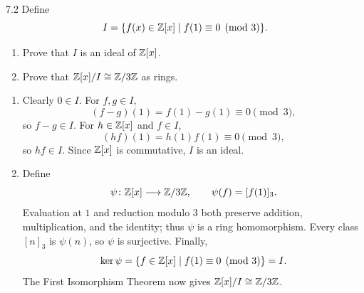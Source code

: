 \documentclass[11pt,oneside]{article}
\begin{document}
\begin{problem}{7.2}
Define
\[
I=\{f(x)\in\mathbb{Z}[x]\mid f(1)\equiv0\pmod3\}.
\]
\begin{enumerate}[label=(\alph*),leftmargin=2.5em,itemsep=0.2em,topsep=0.35em]
\item Prove that $I$ is an ideal of $\mathbb{Z}[x]$.
\item Prove that $\mathbb{Z}[x]/I\cong\mathbb{Z}/3\mathbb{Z}$ as rings.
\end{enumerate}
\end{problem}
\begin{solution}
\begin{enumerate}[label=(\alph*),leftmargin=2.5em,itemsep=0.55em,topsep=0.2em]
\item Clearly $0\in I$. For $f,g\in I$,
\[
(f-g)(1)=f(1)-g(1)\equiv0\pmod3,
\]
so $f-g\in I$. For $h\in\mathbb{Z}[x]$ and $f\in I$,
\[
(hf)(1)=h(1)f(1)\equiv0\pmod3,
\]
so $hf\in I$. Since $\mathbb{Z}[x]$ is commutative, $I$ is an ideal.
\item Define
\[
\psi\colon\mathbb{Z}[x]\longrightarrow\mathbb{Z}/3\mathbb{Z},
\qquad \psi(f)=[f(1)]_3.
\]
Evaluation at $1$ and reduction modulo $3$ both preserve addition, multiplication, and the identity; thus $\psi$ is a ring homomorphism. Every class $[n]_3$ is $\psi(n)$, so $\psi$ is surjective. Finally,
\[
\ker\psi=\{f\in\mathbb{Z}[x]\mid f(1)\equiv0\pmod3\}=I.
\]
The First Isomorphism Theorem now gives $\mathbb{Z}[x]/I\cong\mathbb{Z}/3\mathbb{Z}$.
\end{enumerate}
\end{solution}
\end{document}
